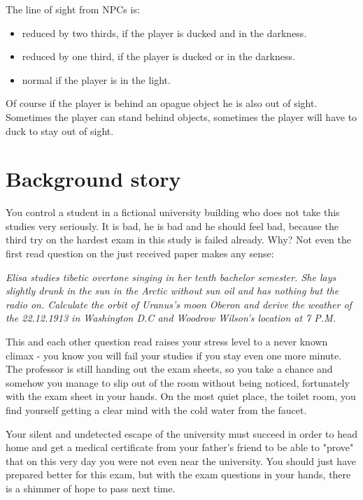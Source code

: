 \documentclass[12pt]{article}
\begin{document}
The line of sight from NPCs is:

\begin{itemize}
	\item reduced by two thirds, if the player is ducked and in the darkness.
	\item reduced by one third, if the player is ducked or in the darkness.
	\item normal if the player is in the light.
\end{itemize}

Of course if the player is behind an opague object he is also out of sight. Sometimes the player can stand behind objects, sometimes the player will have to duck to stay out of sight.



\section*{Background story}
You control a student in a fictional university building who does not take this studies very seriously. It is bad, he is bad and he should feel bad, because the third try on the hardest exam in this study is failed already. Why? Not even the first read question on the just received paper makes any sense: 

\textit{Elisa studies tibetic overtone singing in her tenth bachelor semester. She lays slightly drunk in the sun in the Arctic without sun oil and has nothing but the radio on. Calculate the orbit of Uranus's moon Oberon and derive the weather of the 22.12.1913 in Washington D.C and Woodrow Wilson's location at 7 P.M.}

This and each other question read raises your stress level to a never known climax - you know you will fail your studies if you stay even one more minute. The professor is still handing out the exam sheets, so you take a chance and somehow you manage to slip out of the room without being noticed, fortunately with the exam sheet in your hands. On the most quiet place, the toilet room, you find yourself getting a clear mind with the cold water from the faucet.

Your silent and undetected escape of the university must succeed in order to head home and get a medical certificate from your father's friend to be able to "prove" that on this very day you were not even near the university. You should just have prepared better for this exam, but with the exam questions in your hands, there is a shimmer of hope to pass next time.
\end{document}
